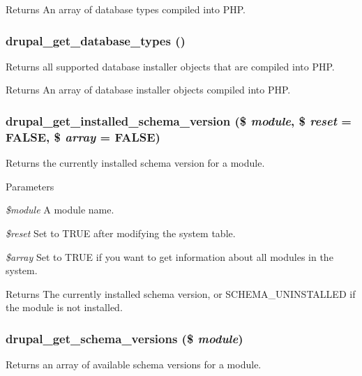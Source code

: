 \begin{DoxyReturn}{Returns}
An array of database types compiled into PHP. 
\end{DoxyReturn}
\hypertarget{install_8inc_acc31c9690e30c375bba969c4e5584c71}{
\subsubsection[{drupal\_\-get\_\-database\_\-types}]{\setlength{\rightskip}{0pt plus 5cm}drupal\_\-get\_\-database\_\-types ()}}
\label{install_8inc_acc31c9690e30c375bba969c4e5584c71}
Returns all supported database installer objects that are compiled into PHP.

\begin{DoxyReturn}{Returns}
An array of database installer objects compiled into PHP. 
\end{DoxyReturn}
\hypertarget{install_8inc_a7702ece36adbef6e165e6f9c2bde5953}{
\subsubsection[{drupal\_\-get\_\-installed\_\-schema\_\-version}]{\setlength{\rightskip}{0pt plus 5cm}drupal\_\-get\_\-installed\_\-schema\_\-version (\$ {\em module}, \/  \$ {\em reset} = {\ttfamily FALSE}, \/  \$ {\em array} = {\ttfamily FALSE})}}
\label{install_8inc_a7702ece36adbef6e165e6f9c2bde5953}
Returns the currently installed schema version for a module.


\begin{DoxyParams}{Parameters}
\item[{\em \$module}]A module name. \item[{\em \$reset}]Set to TRUE after modifying the system table. \item[{\em \$array}]Set to TRUE if you want to get information about all modules in the system. \end{DoxyParams}
\begin{DoxyReturn}{Returns}
The currently installed schema version, or SCHEMA\_\-UNINSTALLED if the module is not installed. 
\end{DoxyReturn}
\hypertarget{install_8inc_a1e68a61662f821bde8606568fda7bf58}{
\subsubsection[{drupal\_\-get\_\-schema\_\-versions}]{\setlength{\rightskip}{0pt plus 5cm}drupal\_\-get\_\-schema\_\-versions (\$ {\em module})}}
\label{install_8inc_a1e68a61662f821bde8606568fda7bf58}
Returns an array of available schema versions for a module.


